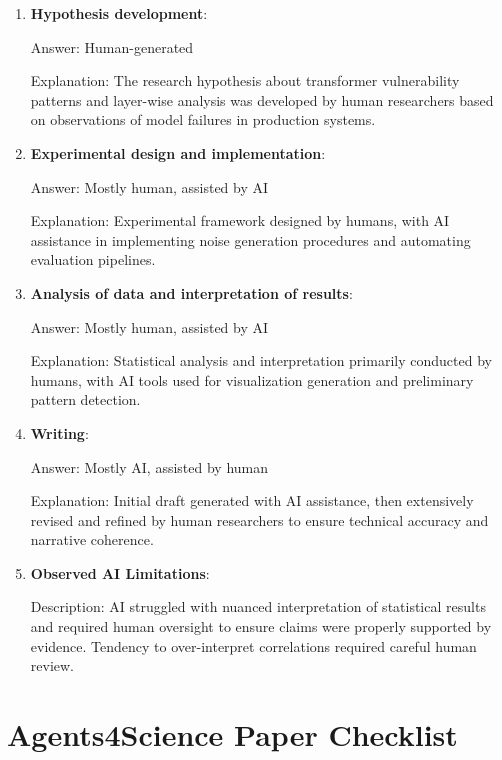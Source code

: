 \documentclass{article}
\begin{document}
\begin{enumerate}
    \item \textbf{Hypothesis development}:

    Answer: Human-generated

    Explanation: The research hypothesis about transformer vulnerability patterns and layer-wise analysis was developed by human researchers based on observations of model failures in production systems.

    \item \textbf{Experimental design and implementation}:

    Answer: Mostly human, assisted by AI

    Explanation: Experimental framework designed by humans, with AI assistance in implementing noise generation procedures and automating evaluation pipelines.

    \item \textbf{Analysis of data and interpretation of results}:

    Answer: Mostly human, assisted by AI

    Explanation: Statistical analysis and interpretation primarily conducted by humans, with AI tools used for visualization generation and preliminary pattern detection.

    \item \textbf{Writing}:

    Answer: Mostly AI, assisted by human

    Explanation: Initial draft generated with AI assistance, then extensively revised and refined by human researchers to ensure technical accuracy and narrative coherence.

    \item \textbf{Observed AI Limitations}:

    Description: AI struggled with nuanced interpretation of statistical results and required human oversight to ensure claims were properly supported by evidence. Tendency to over-interpret correlations required careful human review.
\end{enumerate}

\newpage

\section*{Agents4Science Paper Checklist}
\end{document}
